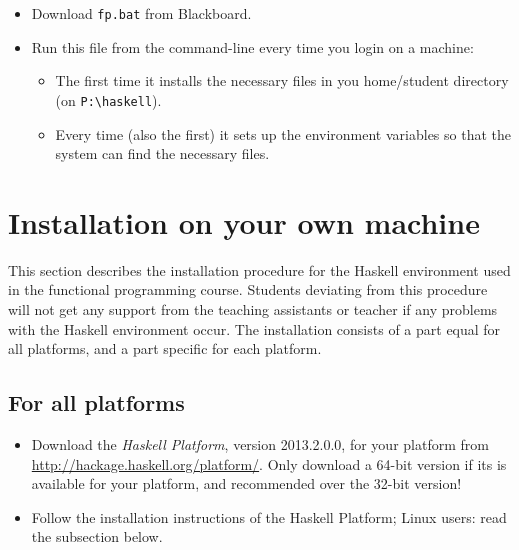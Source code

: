\documentclass[]{article}
\begin{document}
\begin{itemize}
  \item Download \texttt{fp.bat} from Blackboard.
  \item Run this file from the command-line every time you login on a machine:
    \begin{itemize}
      \item The first time it installs the necessary files in you home/student directory (on \texttt{P:\textbackslash{}haskell}).
      \item Every time (also the first) it sets up the environment variables so that the system can find the necessary files.
    \end{itemize}
\end{itemize}

\section{Installation on your own machine}
This section describes the installation procedure for the Haskell environment used in the functional programming course.
Students deviating from this procedure will not get any support from the teaching assistants or teacher if any problems with the Haskell environment occur.
The installation consists of a part equal for all platforms, and a part specific for each platform.

\subsection{For all platforms}
\begin{itemize}
  \item Download the \emph{Haskell Platform}, version 2013.2.0.0, for your platform from \url{http://hackage.haskell.org/platform/}. Only download a 64-bit version if its is available for your platform, and recommended over the 32-bit version!
  \item Follow the installation instructions of the Haskell Platform; Linux users: read the subsection below.
\end{itemize}
\end{document}

